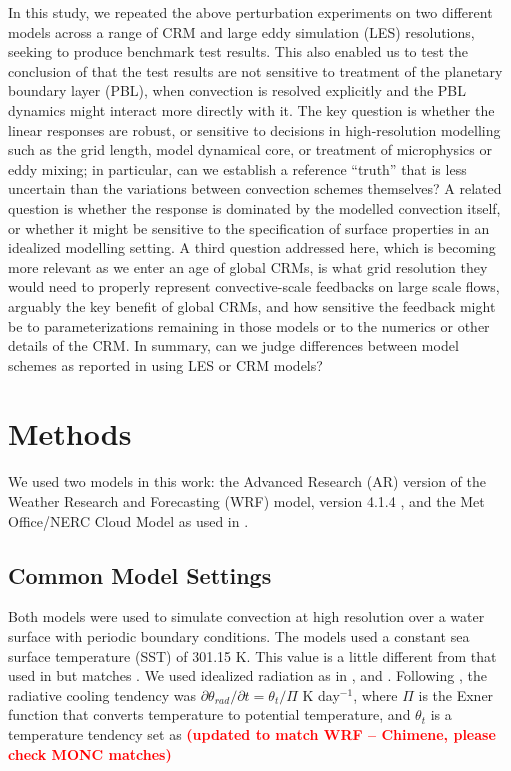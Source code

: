 \documentclass[draft]{agujournal2019}
\newcommand{\todo}[1]{\textcolor{red}{\textbf{(#1)}}}
\begin{document}
In this study, we repeated the above perturbation experiments on two different
models across a range of CRM and large eddy simulation (LES) resolutions,
seeking to produce benchmark test results. This also enabled us to test the
conclusion of  that the test results are not sensitive
to treatment of the planetary boundary layer (PBL), when convection is resolved
explicitly and the PBL dynamics might interact more directly with it. The key
question is whether the linear responses are robust, or sensitive to decisions
in high-resolution modelling such as the grid length, model dynamical core, or
treatment of microphysics or eddy mixing; in particular, can we establish a
reference ``truth'' that is less uncertain than the variations between
convection schemes themselves? A related question is whether the response is
dominated by the modelled convection itself, or whether it might be sensitive to
the specification of surface properties in an idealized modelling setting. A
third question addressed here, which is becoming more relevant as we enter an
age of global CRMs, is what grid resolution they would need to properly
represent convective-scale feedbacks on large scale flows, arguably the key
benefit of global CRMs, and how sensitive the feedback might be to
parameterizations remaining in those models or to the numerics or other details
of the CRM. In summary, can we judge differences between model schemes as
reported in  using LES or CRM models?

\section{Methods}
\label{sec:methods}

We used two models in this work: the Advanced Research (AR) version of the
Weather Research and Forecasting (WRF) model, version 4.1.4
\cite{Skamarock_2019}, and the Met Office/NERC Cloud Model
\cite<MONC,>{Brown_2020} as used in .

\subsection{Common Model Settings}

Both models were used to simulate convection at high resolution over a water
surface with periodic boundary conditions. The models used a constant sea
surface temperature (SST) of 301.15 K. This value is a little different from
that used in  but matches . We
used idealized radiation as in , 
and . Following , the radiative
cooling tendency was $\partial \theta_{rad} / \partial t = \theta_t/\Pi$ K
day$^{-1}$, where $\Pi$ is the Exner function that converts temperature to
potential temperature, and $\theta_t$ is a temperature tendency set as
\todo{updated to match WRF -- Chimene, please check MONC matches}
\end{document}
